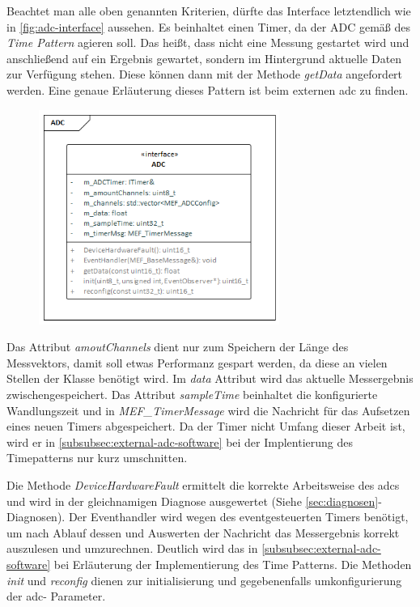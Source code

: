 Beachtet man alle oben genannten Kriterien, dürfte das Interface letztendlich wie in \autoref{fig:adc-interface} aussehen.
Es beinhaltet einen Timer, da der ADC gemäß des \textit{Time Pattern} agieren soll.
Das heißt, dass nicht eine Messung gestartet wird und anschließend auf ein Ergebnis gewartet, sondern im Hintergrund aktuelle Daten zur Verfügung stehen.
Diese können dann mit der Methode \textit{getData} angefordert werden.
Eine genaue Erläuterung dieses Pattern ist beim externen \ac{adc} zu finden.

\begin{figure}[!htb]
    \begin{center}
        \includegraphics[width=0.7\textwidth]{Figures/Chapter_3/ADC.png}
        
        \label{fig:adc-interface}
    \end {center}
\end{figure}

Das Attribut \textit{amoutChannels} dient nur zum Speichern der Länge des Messvektors, damit soll etwas Performanz gespart werden, da diese an vielen Stellen der Klasse benötigt wird.
Im \textit{data} Attribut wird das aktuelle Messergebnis zwischengespeichert.
Das Attribut \textit{sampleTime} beinhaltet die konfigurierte Wandlungszeit und in \textit{MEF\_TimerMessage} wird die Nachricht für das Aufsetzen eines neuen Timers abgespeichert.
Da der Timer nicht Umfang dieser Arbeit ist, wird er in \autoref{subsubsec:external-adc-software} bei der Implentierung des Timepatterns nur kurz umschnitten.

Die Methode \textit{DeviceHardwareFault} ermittelt die korrekte Arbeitsweise des \ac{adc}s und wird in der gleichnamigen Diagnose ausgewertet (Siehe \autoref{sec:diagnosen}- Diagnosen).
Der Eventhandler wird wegen des eventgesteuerten Timers benötigt, um nach Ablauf dessen und Auswerten der Nachricht das Messergebnis korrekt auszulesen und umzurechnen.
Deutlich wird das in \autoref{subsubsec:external-adc-software} bei Erläuterung der Implementierung des Time Patterns.
Die Methoden \textit{init} und \textit{reconfig} dienen zur initialisierung und gegebenenfalls umkonfigurierung der \ac{adc}- Parameter.


